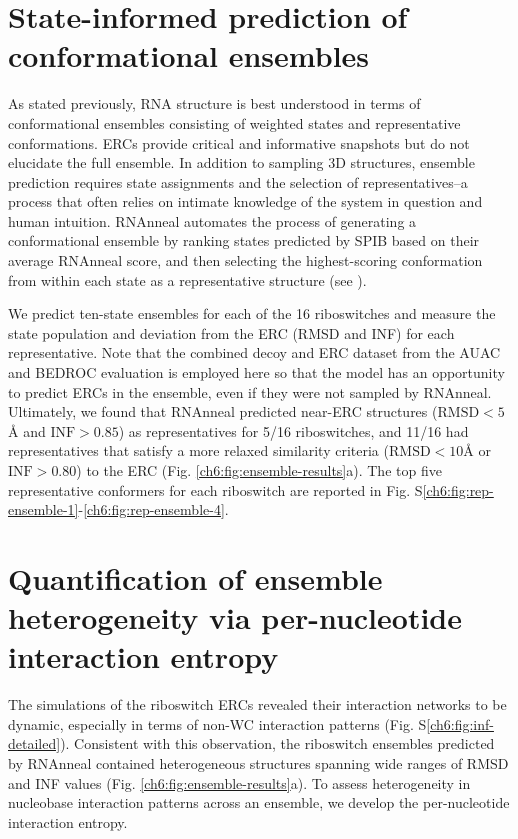 \section{State-informed prediction of conformational ensembles}

As stated previously, RNA structure is best understood in terms of conformational ensembles consisting of weighted states and representative conformations. ERCs provide critical and informative snapshots but do not elucidate the full ensemble. In addition to sampling 3D structures, ensemble prediction requires state assignments and the selection of representatives--a process that often relies on intimate knowledge of the system in question and human intuition. RNAnneal automates the process of generating a conformational ensemble by ranking states predicted by SPIB based on their average RNAnneal score, and then selecting the highest-scoring conformation from within each state as a representative structure (see ).

We predict ten-state ensembles for each of the 16 riboswitches and measure the state population and deviation from the ERC (RMSD and INF) for each representative. Note that the combined decoy and ERC dataset from the AUAC and BEDROC evaluation is employed here so that the model has an opportunity to predict ERCs in the ensemble, even if they were not sampled by RNAnneal. Ultimately, we found that RNAnneal predicted near-ERC structures ($\mathrm{RMSD}<5${\AA} and $\mathrm{INF}>0.85$) as representatives for 5/16 riboswitches, and 11/16 had representatives that satisfy a more relaxed similarity criteria ($\mathrm{RMSD}<10${\AA} or $\mathrm{INF}>0.80$) to the ERC (Fig. \ref{ch6:fig:ensemble-results}a). The top five representative conformers for each riboswitch are reported in Fig. S\ref{ch6:fig:rep-ensemble-1}-\ref{ch6:fig:rep-ensemble-4}.

\section{Quantification of ensemble heterogeneity via
per-nucleotide interaction entropy}

The simulations of the riboswitch ERCs revealed their interaction networks to be dynamic, especially in terms of non-WC interaction patterns (Fig. S\ref{ch6:fig:inf-detailed}). Consistent with this observation, the riboswitch ensembles predicted by RNAnneal contained heterogeneous structures spanning wide ranges of RMSD and INF values (Fig. \ref{ch6:fig:ensemble-results}a). To assess heterogeneity in nucleobase interaction patterns across an ensemble, we develop the per-nucleotide interaction entropy.

